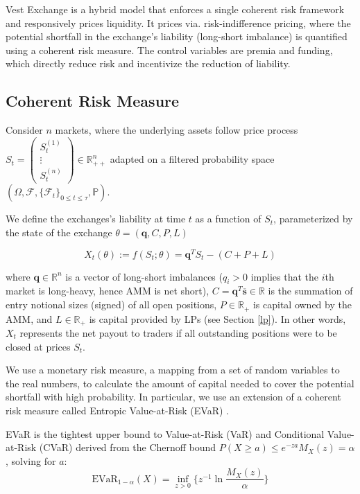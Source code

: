 \documentclass{article}
\begin{document}
Vest Exchange is a hybrid model that enforces a single coherent risk framework and responsively prices liquidity. It prices via. risk-indifference pricing, where the potential shortfall in the exchange's liability (long-short imbalance) is quantified using a coherent risk measure. The control variables are premia and funding, which directly reduce risk and incentivize the reduction of liability.

\subsection{Coherent Risk Measure}\label{risk}
Consider $n$ markets, where the underlying assets follow price process $S_t = \begin{pmatrix} S^{(1)}_t \\ \vdots \\ S^{(n)}_t\end{pmatrix} \in \mathbb{R}^n_{++}$ adapted on a filtered probability space $(\Omega, \mathcal{F}, \{\mathcal{F}_t\}_{0\leq t \leq \tau}, \mathbb{P})$.

We define the exchanges's liability at time $t$ as a function of $S_t$, parameterized by the state of the exchange $\theta = (\mathbf{q}, C, P, L)$

\begin{equation}
    X_t(\theta) 
    := f(S_t;\theta)= \mathbf{q}^TS_t-(C+P+L)
\end{equation}

where $\mathbf{q} \in \mathbb{R}^n$ is a vector of long-short imbalances ($ q_i > 0$ implies that the $i$th market is long-heavy, hence AMM is net short), $C = \mathbf{q}^T\overline{\mathbf{s}} \in \mathbb{R}$ is the summation of entry notional sizes (signed) of all open positions, $P \in \mathbb{R}_+$ is capital owned by the AMM, and $L \in \mathbb{R}_+$ is capital provided by LPs (see Section \ref{lp}). In other words, $X_t$ represents the net payout to traders if all outstanding positions were to be closed at prices $S_t$. 

We use a monetary risk measure, a mapping from a set of random variables to the real numbers, to calculate the amount of capital needed to cover the potential shortfall with high probability. In particular, we use an extension of a coherent risk measure called Entropic Value-at-Risk (EVaR) \cite{ahmadi2012entropic}.

EVaR is the tightest upper bound to Value-at-Risk (VaR) and Conditional Value-at-Risk (CVaR) derived from the Chernoff bound $P(X\geq a) \leq e^{-za}M_X(z)=\alpha$, solving for $a$:
\begin{equation}
    \text{EVaR}_{1-\alpha}(X) = \inf_{z > 0} \{ z^{-1} \ln \frac{M_X(z)}{\alpha} \}
\end{equation}
\end{document}
